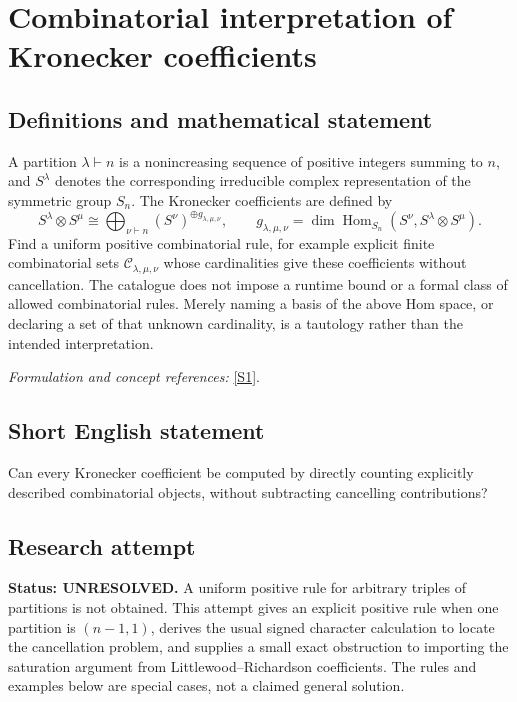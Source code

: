 \documentclass[11pt]{article}
\begin{document}
\section*{\texorpdfstring{Combinatorial interpretation of Kronecker coefficients}{Combinatorial interpretation of Kronecker coefficients}}\label{3200011}
\subsection{Definitions and mathematical statement}
A partition $\lambda\vdash n$ is a nonincreasing sequence of positive integers summing to $n$, and $S^\lambda$ denotes the corresponding irreducible complex representation of the symmetric group $S_n$. The Kronecker coefficients are defined by
\[
 S^\lambda\otimes S^\mu\cong
 \bigoplus_{\nu\vdash n}(S^\nu)^{\oplus g_{\lambda,\mu,\nu}},
 \qquad
 g_{\lambda,\mu,\nu}=\dim\operatorname{Hom}_{S_n}
 (S^\nu,S^\lambda\otimes S^\mu).
\]
Find a uniform positive combinatorial rule, for example explicit finite combinatorial sets $\mathcal C_{\lambda,\mu,\nu}$ whose cardinalities give these coefficients without cancellation. The catalogue does not impose a runtime bound or a formal class of allowed combinatorial rules. Merely naming a basis of the above Hom space, or declaring a set of that unknown cardinality, is a tautology rather than the intended interpretation.
\par\smallskip\textit{Formulation and concept references:} \href{https://arxiv.org/abs/2604.23286}{[S1]}.

\subsection{Short English statement}
Can every Kronecker coefficient be computed by directly counting explicitly described combinatorial objects, without subtracting cancelling contributions?
\subsection{Research attempt}
\textbf{Status: UNRESOLVED.} A uniform positive rule for arbitrary triples of partitions is not obtained. This attempt gives an explicit positive rule when one partition is $(n-1,1)$, derives the usual signed character calculation to locate the cancellation problem, and supplies a small exact obstruction to importing the saturation argument from Littlewood--Richardson coefficients. The rules and examples below are special cases, not a claimed general solution.
\end{document}
